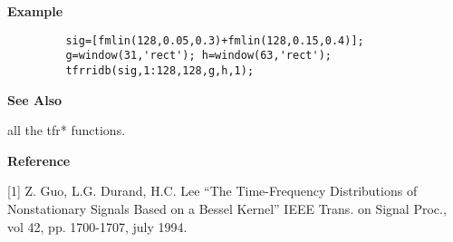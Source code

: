 \newpage

{\bf \large {}\selectfont Example}
\begin{verbatim}
         sig=[fmlin(128,0.05,0.3)+fmlin(128,0.15,0.4)];  
         g=window(31,'rect'); h=window(63,'rect');  
         tfrridb(sig,1:128,128,g,h,1);
\end{verbatim}
\vspace*{.5cm}

{\bf \large {}\selectfont See Also}\\
\hspace*{1.5cm}
\begin{minipage}[t]{13.5cm}
all the {\ty tfr*} functions.
\end{minipage}
\vspace*{.5cm}


{\bf \large {}\selectfont Reference}\\
\hspace*{1.5cm}
\begin{minipage}[t]{13.5cm}
[1] Z. Guo, L.G. Durand, H.C. Lee ``The Time-Frequency Distributions of
Nonstationary Signals Based on a Bessel Kernel'' IEEE Trans. on Signal
Proc., vol 42, pp. 1700-1707, july 1994.
\end{minipage}

